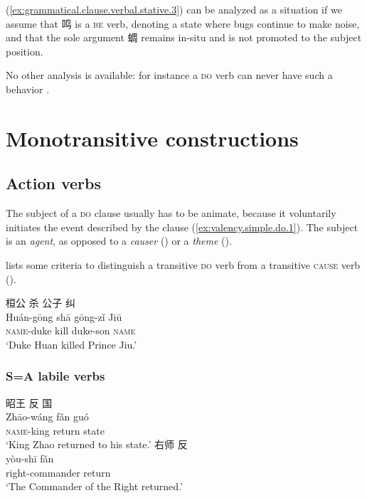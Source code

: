 \documentclass[UTF8, a4paper, oneside, scheme=plain, 12pt]{ctexrep}
\newcommand*{\citepage}[1]{p.~{#1}}
\newcommand*{\term}[1]{\emph{#1}}
\newcommand{\translate}[1]{`#1'}
\newcommand*{\category}[1]{\textsc{#1}}
\begin{document}
(\ref{ex:grammatical.clause.verbal.stative.3}) can be analyzed as a situation
if we assume that 鸣 is a \category{be} verb,
denoting a state where bugs continue to make noise,
and that the sole argument 蜩 remains in-situ and is not promoted to the subject position.

No other analysis is available: for instance a \category{do} verb can never have such a behavior
\citep[\citepage{351}]{meiguang2018}.



\section{Monotransitive constructions}

\subsection{Action verbs}
\label{sec:valency.simple.do}

The subject of a \category{do} clause usually has to be animate,
because it voluntarily initiates the event described by the clause
(\ref{ex:valency.simple.do.1}).
The subject is an \term{agent}, as opposed to a \term{causer} ()
or a \term{theme} ().

\citet[\citepage{272}]{meiguang2018} lists some criteria
to distinguish a transitive \category{do} verb 
from a transitive \category{cause} verb
().

\begin{exe}
    \ex\label{ex:valency.simple.do.1}
    \glll 桓公 杀 公子 纠 \\
    Huán-gōng shā gōng-zǐ Jiū \\
    \category{name}-duke kill duke-son \category{name} \\
    \glt\translate{Duke Huan killed Prince Jiu.}
\end{exe}

\subsubsection{S=A labile verbs}\label{sec:valency.monotransitive.s-a}

\begin{exe}
    \ex\label{ex:grammatical.clause.argument.do-shift.transitive.1}
    \glll 昭王 反 国 \\
    Zhāo-wáng fǎn guó \\
    \category{name}-king return state \\
    \glt\translate{King Zhao returned to his state.}
    \ex\label{ex:grammatical.clause.argument.do-shift.intransitive.1}
    \glll 右师 反 \\
    yòu-shī fǎn \\
    right-commander return \\
    \glt\translate{The Commander of the Right returned.}
\end{exe}
\end{document}
